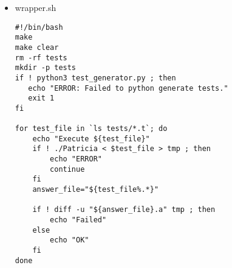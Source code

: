 \documentclass[pdf, unicode, 12pt, a4paper,oneside,fleqn]{article}
\begin{document}
\begin{itemize}
\begin{lstlisting}
int main() {
    std::ofstream fout("benchTime");
    std::map<std::string, unsigned long long> map;
    std::string buffer;
    char action;
    unsigned long long value;
    clock_t start = clock();
    while(true) {
        Parsing(action, buffer, value);
        if(action == 'E') {
            break;
        }
        switch(action) {
            case '+':
                if(map.count(buffer) == 0) {
                    map[buffer] = value;
                    printf("OK\n");
                } else {
                    printf("Exist\n");
                }
                break;
            case '-':
                if (map[buffer] == 0) {
                    printf("NoSuchWord\n");
                }
                else {
                    map.erase(buffer);
                    printf("OK\n");
                }
                break;
            case 'F':
                if (map[buffer] == 0) {
                    printf("NoSuchWord\n");
                }
                else {
                    printf("OK: %lu\n", map[buffer]);
                }
                break;
        }
    }
    clock_t finish = clock();
    double time = (double) (finish - start)/ CLOCKS_PER_SEC;
    fout << "Std map time:" << time << std::endl;
    fout.close();
    return 0;
}

void LowerString(std::string& buffer) {
    int index = 0;
    while (index < buffer.size()) {
        if (buffer[index] >= 'A' && buffer[index] <= 'Z') {
            buffer[index] += -'A' + 'a';
        }
        index++;
    }
}

void Parsing(char &action, std::string& buffer, unsigned long long &value) {
    char ch;
    size_t i = 0;
    ch = getchar();
    if (ch == EOF) {
        action = 'E';
        return;
    }
    if (ch == '+') {
        action = ch;
        getchar();
        std::cin >> buffer >>value;
        getchar();
        LowerString(buffer);
    } else if (ch == '-') {
        action = ch;
        getchar();
        std::cin >> buffer;
        getchar();
        LowerString(buffer);
    } else if (ch == '!') {
        getchar();
        action = getchar();
        while((ch = getchar()) != ' ') {
            i++;
        }
        scanf("%s", buffer);
        getchar();
    } else {
        action = 'F';
        buffer[i++] = ch;
        while((ch = getchar()) != '\n') {
            buffer[i++] = ch;
        }
        buffer[i] = '\0';
        LowerString(buffer);
    }
}
\end{lstlisting}
\newpage
\item wrapper.sh
\lstset{language=BASH}
\begin{lstlisting}
#!/bin/bash
make
make clear
rm -rf tests
mkdir -p tests
if ! python3 test_generator.py ; then
   echo "ERROR: Failed to python generate tests."
   exit 1
fi

for test_file in `ls tests/*.t`; do
    echo "Execute ${test_file}"
    if ! ./Patricia < $test_file > tmp ; then
        echo "ERROR"
        continue
    fi
    answer_file="${test_file%.*}"

    if ! diff -u "${answer_file}.a" tmp ; then
        echo "Failed"
    else
        echo "OK"
    fi 
done
\end{lstlisting}
\end{itemize}
\newpage
\end{document}
